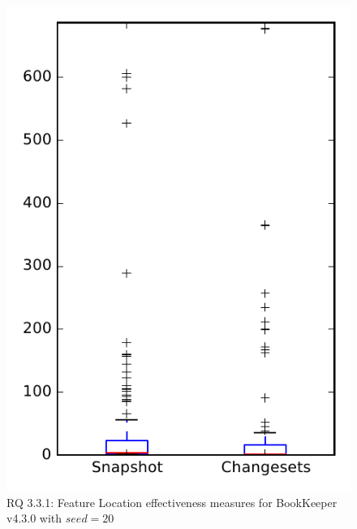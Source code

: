 
\begin{figure}
\centering
\includegraphics[height=0.4\textheight]{figures/flt_seed/rq1_bookkeeper_20}
\caption{RQ 3.3.1: Feature Location effectiveness measures for BookKeeper v4.3.0 with $seed=20$}
\label{fig:flt_seed:rq1:bookkeeper}
\end{figure}
